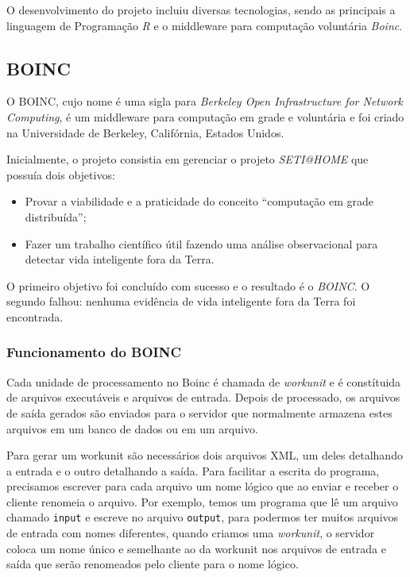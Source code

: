 O desenvolvimento do projeto incluiu diversas tecnologias, sendo as principais a linguagem de Programação \emph{R} e o middleware
para computação voluntária \emph{Boinc}.

\subsection{BOINC}


O BOINC, cujo nome é uma sigla para \textit{Berkeley Open Infrastructure for Network Computing}, é um middleware 
para computação em grade e voluntária e foi criado na Universidade de Berkeley, Califórnia, Estados Unidos.

Inicialmente, o projeto consistia em gerenciar o projeto \textit{SETI@HOME} que possuía dois objetivos:

\begin{itemize}
	\item Provar a viabilidade e a praticidade do conceito ``computação em grade distribuída'';
	\item Fazer um trabalho científico útil fazendo uma análise observacional para detectar vida inteligente fora da Terra.
\end{itemize}

O primeiro objetivo foi concluído com sucesso e o resultado é o \textit{BOINC}. O segundo falhou: nenhuma evidência de 
vida inteligente fora da Terra foi encontrada. 

\subsubsection{Funcionamento do BOINC}

Cada unidade de processamento no Boinc é chamada de \emph{workunit} e é constítuida de arquivos executáveis e 
arquivos de entrada. Depois de processado, os arquivos de saída gerados são enviados para o servidor que
normalmente armazena estes arquivos em um banco de dados ou em um arquivo.

Para gerar um workunit são necessários dois arquivos XML, um deles detalhando a entrada e o 
outro detalhando a saída. Para facilitar a escrita do programa, precisamos escrever para cada arquivo um nome lógico 
que ao enviar e receber o cliente renomeia o arquivo. Por exemplo, temos um programa que lê um arquivo chamado 
\verb#input# e escreve no arquivo \verb#output#, para podermos ter muitos arquivos de entrada com nomes diferentes, quando
criamos uma \emph{workunit}, o servidor coloca um nome único e semelhante ao da workunit nos arquivos de entrada e saída que serão renomeados
pelo cliente para o nome lógico.

